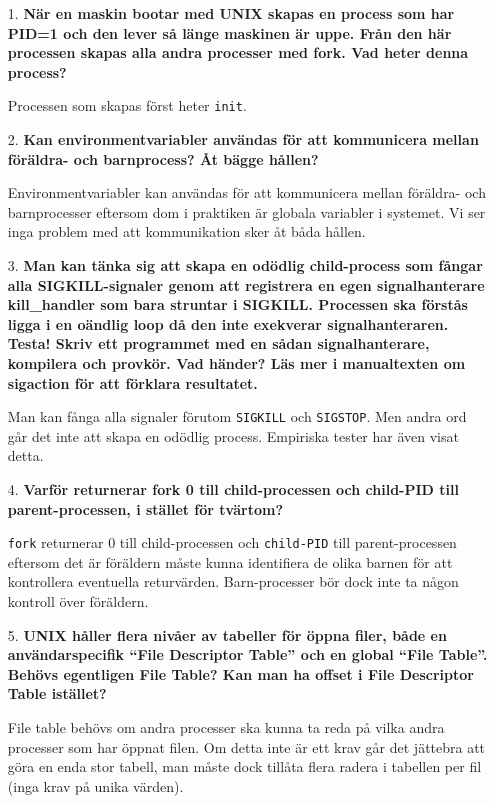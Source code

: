 \documentclass[a4paper,10pt]{article}
\begin{document}
\begin{enumerate}
	\item[1.] \textbf{\footnotesize När en maskin bootar med UNIX skapas en process som har PID=1 och den lever så länge maskinen är uppe. Från den här processen skapas alla andra processer med fork. Vad heter denna process?}
	
	Processen som skapas först heter \verb!init!.

	\item[2.] \textbf{\footnotesize Kan environmentvariabler användas för att kommunicera mellan föräldra- och barnprocess? Åt bägge hållen?}

	Environmentvariabler kan användas för att kommunicera mellan föräldra- och barnprocesser eftersom dom i praktiken är globala variabler i systemet. Vi ser inga problem med att kommunikation sker åt båda hållen.

	\item[3.] \textbf{\footnotesize Man kan tänka sig att skapa en odödlig child-process som fångar alla SIGKILL-signaler genom att registrera en egen signalhanterare kill\_handler som bara struntar i SIGKILL. Processen ska förstås ligga i en oändlig loop då den inte exekverar signalhanteraren. Testa! Skriv ett programmet med en sådan signalhanterare, kompilera och provkör. Vad händer? Läs mer i manualtexten om sigaction för att förklara resultatet.}

	Man kan fånga alla signaler förutom \verb!SIGKILL! och \verb!SIGSTOP!. Men andra ord går det inte att skapa en odödlig process. Empiriska tester har även visat detta.

	\item[4.] \textbf{\footnotesize Varför returnerar fork 0 till child-processen och child-PID till parent-processen, i stället för tvärtom?}

	\verb!fork! returnerar 0 till child-processen och \verb!child-PID! till parent-processen eftersom det är föräldern måste kunna identifiera de olika barnen för att kontrollera eventuella returvärden. Barn-processer bör dock inte ta någon kontroll över föräldern.

	\item[5.] \textbf{\footnotesize UNIX håller flera nivåer av tabeller för öppna filer, både en användarspecifik ``File Descriptor Table'' och en global ``File Table''. Behövs egentligen File Table? Kan man ha offset i File Descriptor Table istället?}

	File table behövs om andra processer ska kunna ta reda på vilka andra processer som har öppnat filen. Om detta inte är ett krav går det jättebra att göra en enda stor tabell, man måste dock tillåta flera radera i tabellen per fil (inga krav på unika värden).


\end{enumerate}
\end{document}
